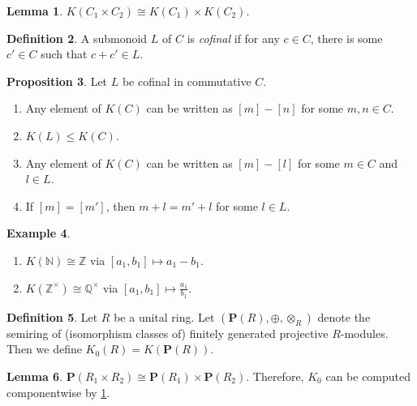 \documentclass[10pt,letterpaper,cm]{nupset}
\theoremstyle{definition}
\newtheorem{definition}{Definition}
\newtheorem{exmp}[definition]{Example}
\theoremstyle{theorem}
\newtheorem{lemma}[definition]{Lemma}
\newtheorem{prop}[definition]{Proposition}
\theoremstyle{remark}
\newcommand{\N}{\mathbb N}
\renewcommand{\P}{\mathbf P}
\newcommand{\Q}{\mathbb Q}
\newcommand{\Z}{\mathbb Z}
\newcommand{\1}{\mathbf{1}}
\newcommand{\0}{\vec 0}
\begin{document}
\begin{lemma}\label{L2}
$K(C_1 \times C_2) \cong K(C_1) \times K(C_2)$.
\end{lemma}

\begin{definition}
A submonoid $L$ of $C$ is \textit{cofinal} if for any $c\in C$, there is some $c' \in C$ such that $c + c' \in L$.
\end{definition}

\begin{prop}\label{prop2} Let $L$ be cofinal in commutative $C$.
\begin{enumerate}
\item Any element of $K(C)$ can be written as $[m]-[n]$ for some $m, n\in  C$.
\item $K(L) \leq K(C)$.
\item Any element of $K(C)$ can be written as $[m] - [l]$ for some $m\in C$ and $l\in L$.
\item If $[m] = [m']$, then $m + l = m' +l$ for some $l\in L$.
\end{enumerate}
\end{prop}

\begin{exmp}\label{Z} $ $
\begin{enumerate}
\item $K(\N) \cong \Z$ via $[a_1, b_1] \mapsto a_1 - b_1$.
\item $K(\Z^{\times}) \cong \Q^{\times}$ via $[a_1, b_1] \mapsto \frac{a_1}{b_1}$.
\end{enumerate}
\end{exmp}

\begin{definition}
Let $R$ be a unital ring. Let $(\P(R), \oplus, \otimes_R)$ denote the semiring  of (isomorphism classes of) finitely generated projective $R$-modules. Then we define $K_0(R) = K(\P(R))$.
\end{definition}

\begin{lemma}
$\P(R_1 \times R_2) \cong \P(R_1) \times \P(R_2)$. Therefore, $K_0$ can be computed componentwise by \cref{L2}. 
\end{lemma}
\end{document}
